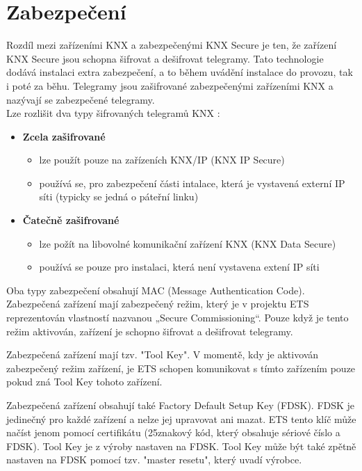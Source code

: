 \section{Zabezpečení}
Rozdíl mezi zařízeními KNX a zabezpečenými KNX Secure je ten, že zařízení KNX Secure jsou schopna šifrovat a dešifrovat telegramy. Tato technologie dodává instalaci extra zabezpečení, a to během uvádění instalace do provozu, tak i poté za běhu. Telegramy jsou zašifrované zabezpečenými zařízeními KNX a nazývají se zabezpečené telegramy.
\\Lze rozlišit dva typy šifrovaných telegramů KNX \cite{KNX Secure}:
\begin{itemize}
  \item \textbf{Zcela zašifrované}
  \begin{itemize}
    \item lze použít pouze na zařízeních KNX/IP (KNX IP Secure)
    \item používá se, pro zabezpečení části intalace, která je vystavená externí IP síti (typicky se jedná o páteřní linku)
  \end{itemize}
  \item \textbf{Čatečně zašifrované}
  \begin{itemize}
    \item lze požít na libovolné komunikační zařízení KNX (KNX Data Secure)
    \item používá se pouze pro instalaci, která není vystavena extení IP síti
  \end{itemize}
\end{itemize}
Oba typy zabezpečení obsahují MAC (Message Authentication Code).
\\Zabezpečená zařízení mají zabezpečený režim, který je v projektu ETS reprezentován vlastností nazvanou „Secure Commissioning“. Pouze když je tento režim aktivován, zařízení je schopno šifrovat a dešifrovat telegramy.

Zabezpečená zařízení mají tzv. "Tool Key". V momentě, kdy je aktivován zabezpečený režim zařízení, je ETS schopen komunikovat s tímto zařízením pouze pokud zná Tool Key tohoto zařízení.

Zabezpečená zařízení obsahují také Factory Default Setup Key (FDSK). FDSK je jedinečný pro každé zařízení a nelze jej upravovat ani mazat. ETS tento klíč může načíst jenom pomocí certifikátu (25znakový kód, který obsahuje sériové číslo a FDSK). Tool Key je z výroby nastaven na FDSK. Tool Key může být také zpětně nastaven na FDSK pomocí tzv. "master resetu", který uvadí výrobce. 

